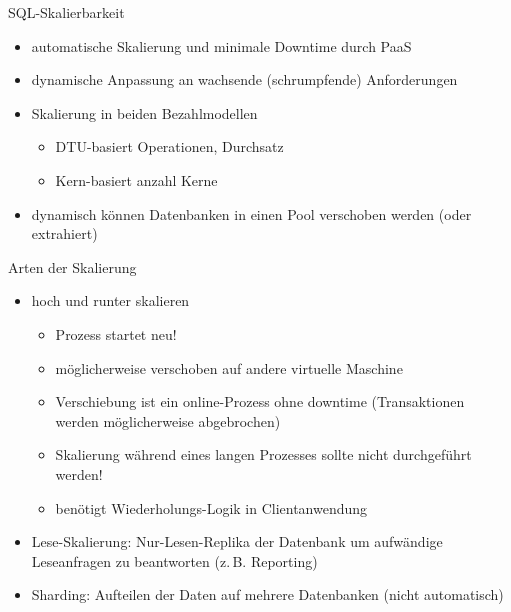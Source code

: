\begin{flashcard}[Definition]{SQL-Skalierbarkeit}
  \begin{itemize}
    \item automatische Skalierung und minimale Downtime durch PaaS
    \item dynamische Anpassung an wachsende (schrumpfende) Anforderungen
    \item Skalierung in beiden Bezahlmodellen
      \begin{itemize}
        \item DTU-basiert\newline
          Operationen, Durchsatz
        \item Kern-basiert\newline
          anzahl Kerne
      \end{itemize}
    \item dynamisch können Datenbanken in einen Pool verschoben werden\newline
      (oder extrahiert)
  \end{itemize}
\end{flashcard}

\begin{flashcard}[Definition]{Arten der Skalierung}
  \begin{itemize}
    \item hoch und runter skalieren
      \begin{itemize}
        \item Prozess startet neu!
        \item möglicherweise verschoben auf andere virtuelle Maschine
        \item Verschiebung ist ein online-Prozess ohne downtime\newline
          (Transaktionen werden möglicherweise abgebrochen)
        \item Skalierung während eines langen Prozesses sollte nicht durchgeführt werden!
        \item benötigt Wiederholungs-Logik in Clientanwendung
      \end{itemize}
    \item Lese-Skalierung: Nur-Lesen-Replika der Datenbank um aufwändige\newline
      Leseanfragen zu beantworten (z.\,B. Reporting)
    \item Sharding: Aufteilen der Daten auf mehrere Datenbanken\newline
      (nicht automatisch)
  \end{itemize}
\end{flashcard}

